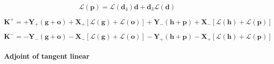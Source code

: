 \begin{equation}
\mathcal{L}(\mathbf{p}) = \mathcal{L}(\mathbf{d}_{4})\mathbf{d} + \mathbf{d}_{3}\mathcal{L}(\mathbf{d})
\label{eq:mem-radiance_at_optical_depth-tangent_linear-o_l}
\end{equation}

\begin{equation}
\mathbf{K}^{+} = +\mathbf{Y}_{+}(\mathbf{g} + \mathbf{o}) + \mathbf{X}_{+}\left[\mathcal{L}(\mathbf{g}) + \mathcal{L}(\mathbf{o})\right] + \mathbf{Y}_{-}(\mathbf{h} + \mathbf{p}) + \mathbf{X}_{-}\left[\mathcal{L}(\mathbf{h}) + \mathcal{L}(\mathbf{p})\right]
\label{eq:mem-radiance_at_optical_depth-tangent_linear-K_p}
\end{equation}

\begin{equation}
\mathbf{K}^{-} = -\mathbf{Y}_{-}(\mathbf{g} + \mathbf{o}) - \mathbf{X}_{-}\left[\mathcal{L}(\mathbf{g}) + \mathcal{L}(\mathbf{o})\right] - \mathbf{Y}_{+}(\mathbf{h} + \mathbf{p}) - \mathbf{X}_{+}\left[\mathcal{L}(\mathbf{h}) + \mathcal{L}(\mathbf{p})\right]
\label{eq:mem-radiance_at_optical_depth-tangent_linear-K_p}
\end{equation}


%
\paragraph{Adjoint of tangent linear}
\label{sec:mem-radiance_at_optical_depth-adjoint_of_tangent_linear}
